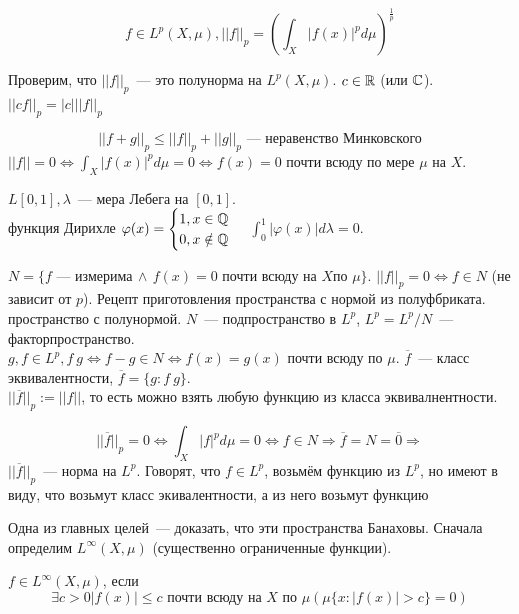 \documentclass[document]{subfiles}
\begin{document}
\[f \in L^p(X, \mu), ||f||_p = \left( \int_X |f(x)|^p d \mu \right)^{\frac{1}{p}} \]

Проверим, что $||f||_p$~--- это полунорма на $L^p(X,\mu)$. $c \in \mathbb{R}$ (или $\mathbb{C}$). $||cf||_p = |c| ||f||_p$

\[ ||f+g||_p \leq ||f||_p + ||g||_p \text{~--- неравенство Минковского} \]
$||f|| = 0 \Leftrightarrow \int_X |f(x)|^p d\mu = 0 \Leftrightarrow f(x) = 0$ почти всюду по мере $\mu$ на $X$.

\begin{example}
    $L[0,1], \lambda$~--- мера Лебега на $[0,1]$. \\
     функция Дирихле $\varphi(x) = \begin{cases}
        1, x \in \mathbb{Q} \\
        0, x \notin \mathbb{Q}
    \end{cases}$
    $\int^1_0 |\varphi(x)|d\lambda = 0$.
\end{example}

$N = \{ f \text{~--- измерима} \, \wedge \, f(x) = 0 \text{ почти всюду на } X \text {по } \mu \}.$
$||f||_p = 0 \Leftrightarrow f \in N$ (не зависит от $p$).
Рецепт приготовления пространства с нормой из полуфбриката. пространство с полунормой.
$N$~--- подпространство в $L^p$, $L^p = L^p / N$~--- факторпространство. \\

$g,f \in L^p, f ~ g \Leftrightarrow f - g \in N \Leftrightarrow f(x) = g(x)$ почти всюду по $\mu$. $\overline{f}$~--- класс эквивалентности, $\overline{f} = \{g: f ~ g \}.$ \\

$||\overline{f}||_p := ||f||$, то есть можно взять любую функцию из класса эквивалнентности.

\[ ||\overline{f}||_p = 0 \Leftrightarrow \int_X |f|^p d\mu = 0 \Leftrightarrow f \in N \Rightarrow \overline{f} = N = \overline{0} \Rightarrow \]
$||\overline{f}||_p $~--- норма на $L^p$.
Говорят, что $f \in L^p$, возьмём функцию из $L^p$, но имеют в виду, что возьмут класс экивалентности, а из него возьмут функцию

Одна из главных целей~--- доказать, что эти пространства Банаховы. Сначала определим $L^\infty(X, \mu)$ (существенно ограниченные функции).

\begin{definition}[$L^\infty(X, \mu)$]
    $f \in L^\infty(X, \mu)$, если 
    \[\exists c > 0 |f(x)| \leq c \text{ почти всюду на } X \text{ по } \mu (\mu \{ x: |f(x)| > c\} = 0)\]
\end{definition}
\end{document}
